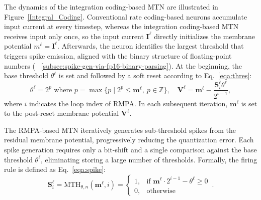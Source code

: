 The dynamics of the integration coding-based MTN are illustrated in Figure~\ref{Integral_Coding}. Conventional rate coding-based neurons accumulate input current at every timestep, whereas the integration coding-based MTN receives input only once, so the input current $\mathbf{I}^\ell$ directly initializes the membrane potential $m^\ell = \mathbf{I}^\ell$.
Afterwards, the neuron identifies the largest 
threshold that triggers spike emission, aligned with the binary structure of floating-point numbers 
( ~\ref{subsec:spike-gen-via-fp16-binary-parsing}). At the beginning, the base threshold $\theta^\ell$ is set and followed by a soft reset according to Eq.~\eqref{eqa:thres}:
\begin{equation}
\label{eqa:thres}
\theta^\ell = 2^p \text{ where } p = \max\{p \mid 2^p \leq \mathbf{m}^\ell,\ p \in \mathbb{Z}\}, \quad\mathbf{V}^\ell = \mathbf{m}^\ell - \frac{\mathbf{S}_i^\ell \theta^\ell}{2^{i-1}},
\end{equation}
where $i$ indicates the loop index of RMPA.
In each subsequent iteration, $\mathbf{m}^\ell$ is set to the post-reset membrane potential $\mathbf{V}^\ell$.

The RMPA-based MTN iteratively generates sub-threshold spikes from the residual membrane potential, progressively reducing the quantization error. Each spike generation requires only a bit-shift and a single comparison against the base threshold $\theta ^\ell$, eliminating storing a large number of thresholds. Formally, the firing rule is defined as Eq.~\eqref{eqa:spike}:
\begin{equation}
\label{eqa:spike}
\mathbf{S}_i^\ell = \mathrm{MTH}_{\theta,n}(\mathbf{m}^\ell, i) = 
\begin{cases}
1, & \text{if } \mathbf{m}^\ell \cdot 2^{i - 1} - {\theta ^\ell} \ge 0\, \\
0, & \text{otherwise}
\end{cases}.
\end{equation}

